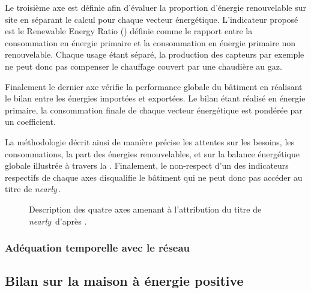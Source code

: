 Le troisième axe est définie afin d’évaluer la proportion d’énergie renouvelable sur site en séparant
le calcul pour chaque vecteur énergétique. L’indicateur proposé est le Renewable Energy Ratio
() définie comme le rapport entre la consommation en énergie primaire et la consommation
en énergie primaire non renouvelable. Chaque usage étant séparé, la production des
capteurs  par exemple ne peut donc pas compenser le chauffage couvert par une chaudière
au gaz.

Finalement le dernier axe vérifie la performance globale du bâtiment en réalisant
le bilan entre les énergies importées et exportées. Le bilan étant réalisé en énergie
primaire, la consommation finale de chaque vecteur énergétique est pondérée par un
coefficient.

La méthodologie décrit ainsi de manière précise les attentes sur les besoins, les
consommations, la part des énergies renouvelables, et sur la balance énergétique globale
illustrée à travers la .
Finalement, le non-respect d’un des indicateurs respectifs de chaque axes disqualifie le bâtiment
qui ne peut donc pas accéder au titre de \textit{nearly}\,.

\begin{figure}
    \centering
    \caption{Description des quatre axes amenant à l’attribution du titre de
             \textit{nearly}\, d’après \textcite{Zirngibl2014}.}
    \label{fig:attribution_nZEB}
\end{figure}


\subsubsection{Adéquation temporelle avec le réseau} %
\label{ssub:adequation_temporelle_avec_le_reseau}




\subsection{Bilan sur la maison à énergie positive} %
\label{sub:bilan_sur_la_BEPOS}





